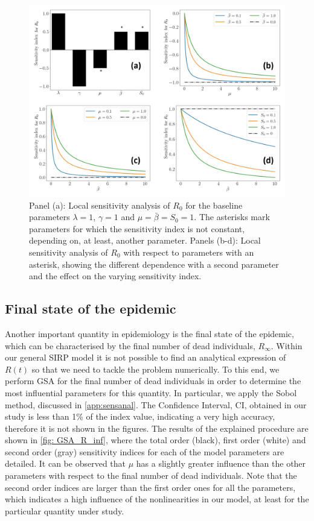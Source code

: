 \begin{figure}[H]
    \centering
    \includegraphics[width=\textwidth]{Figures/R_0_sensitivity.jpg}
    \caption{Panel (a): Local sensitivity analysis of $R_0$ for the
        baseline parameters $\lambda=1$, $\gamma=1$ and
        $\mu=\bar{\beta}=S_0=1$. The
        asterisks mark parameters for which the sensitivity index is not
        constant,
        depending on, at least, another parameter. Panels (b-d): Local
        sensitivity
        analysis of $R_0$ with respect to parameters with an asterisk, showing
        the
        different dependence with a second parameter and the effect on the
        varying
        sensitivity index.}
    \label{fig:Local_Sensitivity_Analysis_R0}
\end{figure}

\subsection{Final state of the epidemic}

Another important quantity in epidemiology is the final state of the
epidemic, which can be characterised by the final number of dead individuals,
$R_\infty$. Within our general SIRP model it is not possible to find an
analytical expression of $R(t)$ so that we need to tackle the problem
numerically. To this end, we perform GSA for the final number of dead
individuals in order to determine the most influential parameters for this
quantity. In particular, we apply the Sobol method, discussed in
\cref{app:sensanal}.
The Confidence Interval, CI, obtained in our
study is less than 1\% of the index value, indicating a very high accuracy,
therefore it is not shown in the figures. The results of the explained
procedure are shown in \cref{fig: GSA_R_inf}, where the total order (black),
first order (white) and second order (gray) sensitivity indices for each of the
model parameters are detailed. It can be observed that $\mu$ has a slightly
greater influence than the other parameters with respect to the final number of
dead individuals. Note that the second order indices are larger than the first
order ones for all the parameters, which indicates a high influence of the
nonlinearities in our model, at least for the particular quantity under study.

